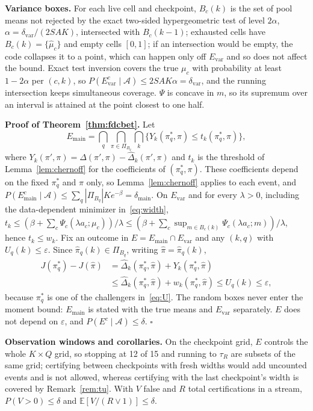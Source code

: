 \documentclass[sigconf,anonymous,review]{acmart}
\newcommand{\cA}{\mathcal{A}}
\newcommand{\eps}{\varepsilon}
\newcommand{\dmain}{\delta_{\text{main}}}
\newcommand{\dvar}{\delta_{\text{var}}}
\begin{document}
\textbf{Variance boxes.} For each live cell and checkpoint, $B_c(k)$ is the set of pool means not rejected by the exact two-sided hypergeometric test of level $2\alpha$, $\alpha = \dvar/(2SAK)$, intersected with $B_c(k-1)$; exhausted cells have $B_c(k) = \{\hat\mu_c\}$ and empty cells $[0,1]$; if an intersection would be empty, the code collapses it to a point, which can happen only off $E_{\text{var}}$ and so does not affect the bound. Exact test inversion covers the true $\mu_c$ with probability at least $1 - 2\alpha$ per $(c,k)$, so $P(E_{\text{var}}^c \mid \cA) \le 2SAK\alpha = \dvar$, and the running intersection keeps simultaneous coverage. $\Psi$ is concave in $m$, so its supremum over an interval is attained at the point closest to one half.

\textbf{Proof of Theorem~\ref{thm:fdcbet}.} Let
\[
E_{\text{main}} = \textstyle\bigcap_{q}\bigcap_{\pi \in \Pi_{B_q}}\bigcap_{k}\{Y_k(\pi^*_q, \pi) \le t_k(\pi^*_q, \pi)\},
\] where $Y_k(\pi', \pi) = \Delta(\pi', \pi) - \hat\Delta_k(\pi', \pi)$ and $t_k$ is the threshold of Lemma~\ref{lem:chernoff} for the coefficients of $(\pi^*_q,\pi)$. These coefficients depend on the fixed $\pi^*_q$ and $\pi$ only, so Lemma~\ref{lem:chernoff} applies to each event, and $P(E_{\text{main}}^c \mid \cA) \le \sum_q |\Pi_{B_q}| K e^{-\beta} = \dmain$. On $E_{\text{var}}$ and for every $\lambda > 0$, including the data-dependent minimizer in~\eqref{eq:width}, $t_k \le (\beta + \sum_c \Psi_c(\lambda a_c;\mu_c))/\lambda \le (\beta + \sum_c \sup_{m \in B_c(k)}\Psi_c(\lambda a_c; m))/\lambda$, hence $t_k \le w_k$. Fix an outcome in $E = E_{\text{main}} \cap E_{\text{var}}$ and any $(k, q)$ with $U_q(k) \le \eps$. Since $\hat\pi_q(k) \in \Pi_{B_q}$, writing $\hat\pi = \hat\pi_q(k)$,
\[
\begin{aligned}
J(\pi^*_q) - J(\hat\pi) &= \hat\Delta_k(\pi^*_q, \hat\pi) + Y_k(\pi^*_q, \hat\pi)\\
&\le \hat\Delta_k(\pi^*_q, \hat\pi) + w_k(\pi^*_q, \hat\pi) \le U_q(k) \le \eps,
\end{aligned}
\]
because $\pi^*_q$ is one of the challengers in~\eqref{eq:U}. The random boxes never enter the moment bound: $E_{\text{main}}$ is stated with the true means and $E_{\text{var}}$ separately. $E$ does not depend on $\eps$, and $P(E^c \mid \cA) \le \delta$. $\square$

\textbf{Observation windows and corollaries.} On the checkpoint grid, $E$ controls the whole $K \times Q$ grid, so stopping at 12 of 15 and running to $\tau_R$ are subsets of the same grid; certifying between checkpoints with fresh widths would add uncounted events and is not allowed, whereas certifying with the last checkpoint's width is covered by Remark~\ref{rem:tu}. With $V$ false and $R$ total certifications in a stream, $P(V > 0) \le \delta$ and $\mathbb{E}[V/(R \vee 1)] \le \delta$.
\end{document}
